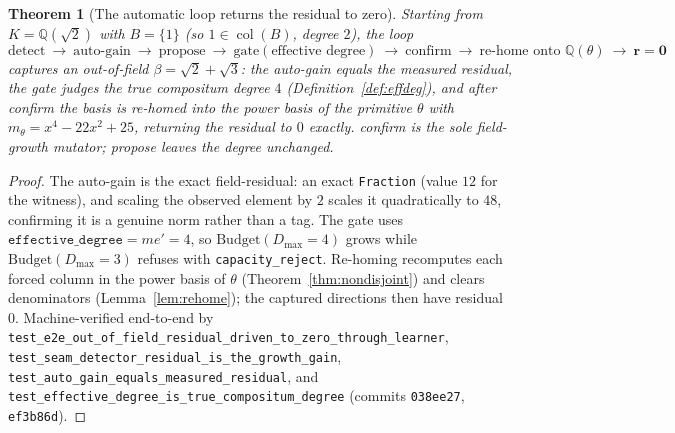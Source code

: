 \documentclass[11pt]{article}
\theoremstyle{plain}
\newtheorem{theorem}{Theorem}[section]
\theoremstyle{definition}
\theoremstyle{remark}
\newcommand{\Q}{\mathbb{Q}}
\newcommand{\K}{K}
\newcommand{\rr}{\mathbf{r}}
\newcommand{\BB}{B}
\DeclareMathOperator{\col}{col}
\begin{document}
\begin{theorem}[The automatic loop returns the residual to zero]\label{thm:loop}
Starting from $\K=\Q(\sqrt2)$ with $\BB=\{1\}$ (so $1\in\col(\BB)$, degree $2$), the loop
\[
  \text{detect}\ \to\ \text{auto-gain}\ \to\ \text{propose}\ \to\ \text{gate}(\text{effective degree})\ \to\
  \text{confirm}\ \to\ \text{re-home onto }\Q(\theta)\ \to\ \rr=\mathbf 0
\]
captures an out-of-field $\beta=\sqrt2+\sqrt3$: the auto-gain equals the measured residual, the gate judges
the \emph{true} compositum degree $4$ (Definition~\ref{def:effdeg}), and after confirm the basis is re-homed
into the power basis of the primitive $\theta$ with $m_\theta=x^4-22x^2+25$, returning the residual to $0$
exactly. \emph{confirm} is the sole field-growth mutator; \emph{propose} leaves the degree unchanged.
\end{theorem}
\begin{proof}
The auto-gain is the exact field-residual: an exact \texttt{Fraction} (value $12$ for the witness), and
scaling the observed element by $2$ scales it quadratically to $48$, confirming it is a genuine norm rather
than a tag. The gate uses $\texttt{effective\_degree}=m e'=4$, so $\mathrm{Budget}(D_{\max}=4)$ grows while
$\mathrm{Budget}(D_{\max}=3)$ refuses with \texttt{capacity\_reject}. Re-homing recomputes each forced column
in the power basis of $\theta$ (Theorem~\ref{thm:nondisjoint}) and clears denominators
(Lemma~\ref{lem:rehome}); the captured directions then have residual $0$. Machine-verified end-to-end by
\texttt{test\_e2e\_out\_of\_field\_residual\_driven\_to\_zero\_through\_learner},
\texttt{test\_seam\_detector\_residual\_is\_the\_growth\_gain},
\texttt{test\_auto\_gain\_equals\_measured\_residual}, and
\texttt{test\_effective\_degree\_is\_true\_compositum\_degree} (commits \texttt{038ee27}, \texttt{ef3b86d}).
\end{proof}
\end{document}
